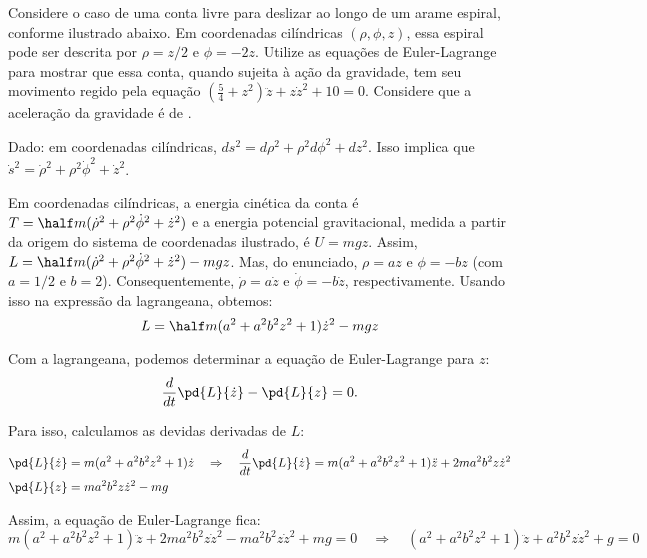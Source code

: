 \begin{question}
	Considere o caso de uma conta livre para deslizar ao longo de um arame espiral, conforme ilustrado abaixo.
	Em coordenadas cilíndricas $(\rho, \phi, z)$, essa espiral pode ser descrita por $\rho = z/2$ e $\phi = -2z$.
	Utilize as equações de Euler-Lagrange para mostrar que essa conta, quando sujeita à ação da gravidade, tem seu movimento regido pela equação $(\frac{5}{4} + z^2)\ddot z + z\dot z^2 + 10 = 0$.
	Considere que a aceleração da gravidade é de .


	\begin{compactdesc}
		\item[Dado:] em coordenadas cilíndricas, $ds^2 = d\rho^2 + \rho^2 d\phi^2 + dz^2$.
		Isso implica que $\dot s^2 = \dot\rho^2 + \rho^2 \dot\phi^2 + \dot z^2$.
	\end{compactdesc}
	
	\begin{solution}
		Em coordenadas cilíndricas, a energia cinética da conta é $T = \half m (\dot\rho^2 + \rho^2\dot\phi^2 + \dot z^2)$ e a energia potencial gravitacional, medida a partir da origem do sistema de coordenadas ilustrado, é $U = mgz$.
		Assim, $L = \half m (\dot\rho^2 + \rho^2\dot\phi^2 + \dot z^2) - mgz$.
		Mas, do enunciado, $\rho = az$ e $\phi = -bz$ (com $a = 1/2$ e $b = 2$).
		Consequentemente, $\dot\rho = a\dot z$ e $\dot \phi = -b\dot z$, respectivamente.
		Usando isso na expressão da lagrangeana, obtemos:
		\begin{equation*}
			L = \half m (a^2 + a^2 b^2 z^2 + 1) \dot z^2 - mgz
		\end{equation*}

		Com a lagrangeana, podemos determinar a equação de Euler-Lagrange para $z$:
		\begin{equation*}
			\frac{d}{dt}\pd{L}{\dot z} - \pd{L}{z} = 0.
		\end{equation*}

		Para isso, calculamos as devidas derivadas de $L$:
		\begin{align*}
			\pd{L}{\dot z} &= m (a^2 + a^2 b^2 z^2 + 1) \dot z \quad\Rightarrow\quad
				\frac{d}{dt}\pd{L}{\dot z} = m (a^2 + a^2 b^2 z^2 + 1) \ddot z + 2ma^2b^2z\dot z^2 \\
			\pd{L}{z} &= ma^2b^2z\dot z^2 - mg
		\end{align*}

		Assim, a equação de Euler-Lagrange fica:
		\begin{equation*}
			m (a^2 + a^2 b^2 z^2 + 1) \ddot z + 2ma^2b^2z\dot z^2 - ma^2b^2z\dot z^2 + mg = 0
			\quad\Rightarrow\quad
			(a^2 + a^2 b^2 z^2 + 1) \ddot z + a^2b^2z\dot z^2 + g = 0
		\end{equation*}


\end{solution}
\end{question}
